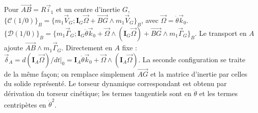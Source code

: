 \begin{corrigebox}
Pour $\overrightarrow{AB}=R\vec i_1$ et un centre d'inertie $G$,
                $\{\mathcal C(1/0)\}_B=\{m_1\vec V_G;\mathbf I_G\vec\Omega+
                \overrightarrow{BG}\wedge m_1\vec V_G\}_B$, avec
                $\vec\Omega=\dot\theta\vec k_0$.
$\{\mathcal D(1/0)\}_B=\{m_1\vec\Gamma_G;
                \mathbf I_G\ddot\theta\vec k_0+
                \vec\Omega\wedge(\mathbf I_G\vec\Omega)+
                \overrightarrow{BG}\wedge m_1\vec\Gamma_G\}_B$.
                Le transport en $A$ ajoute $\overrightarrow{AB}\wedge m_1\vec\Gamma_G$.
Directement en $A$ fixe :
                $\vec\delta_A=d(\mathbf I_A\vec\Omega)/dt|_0=
                \mathbf I_A\ddot\theta\vec k_0+
                \vec\Omega\wedge(\mathbf I_A\vec\Omega)$.
La seconde configuration se traite de la même façon; on remplace
                simplement $\overrightarrow{AG}$ et la matrice d'inertie par celles du
                solide représenté.
Le torseur dynamique correspondant est obtenu par dérivation du
                torseur cinétique; les termes tangentiels sont en $\ddot\theta$ et les
                termes centripètes en $\dot\theta^2$.
\end{corrigebox}
